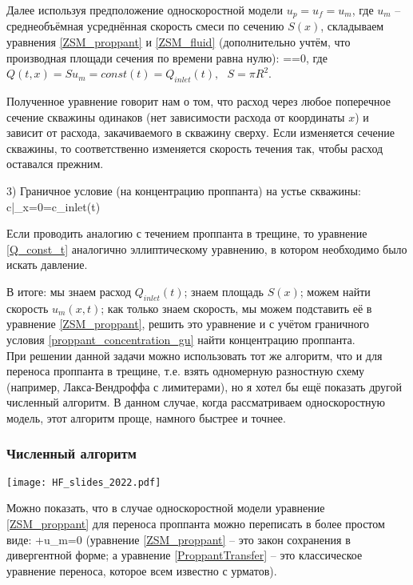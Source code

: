 \documentclass[main.tex]{subfiles}
\begin{document}
Далее используя предположение односкоростной модели $u_p=u_f=u_m$, где $u_m$ -- среднеобъёмная усреднённая скорость смеси по сечению $S(x)$, складываем уравнения \eqref{ZSM_proppant} и \eqref{ZSM_fluid} (дополнительно учтём, что производная площади сечения по времени равна нулю):
\beq\label{Q_const_t}
==0,
\eeq
где $Q(t,x)=Su_m=const(t)=Q_{inlet}(t),\,\,\,\,S=\pi R^2$.

Полученное уравнение говорит нам о том, что расход через любое поперечное сечение скважины одинаков (нет зависимости расхода от координаты $x$) и зависит от расхода, закачиваемого в скважину сверху.
Если изменяется сечение скважины, то соответственно изменяется скорость течения так, чтобы расход оставался прежним.

3) Граничное условие (на концентрацию проппанта) на устье скважины:
\beq\label{proppant_concentration_gu}
c|_{x=0}=c_{inlet}(t)
\eeq

Если проводить аналогию с течением проппанта в трещине, то уравнение \eqref{Q_const_t} аналогично эллиптическому уравнению, в котором необходимо было искать давление.

В итоге: мы знаем расход $Q_{inlet}(t)$; знаем площадь $S(x)$; можем найти скорость $u_m(x,t)$; как только знаем скорость, мы можем подставить её в уравнение \eqref{ZSM_proppant}, решить это уравнение и с учётом граничного условия \eqref{proppant_concentration_gu} найти концентрацию проппанта.
\\

При решении данной задачи можно использовать тот же алгоритм, что и для переноса проппанта в трещине, т.е. взять одномерную разностную схему (например, Лакса-Вендроффа с лимитерами), но я хотел бы ещё показать другой численный алгоритм.
В данном случае, когда рассматриваем односкоростную модель, этот алгоритм проще, намного быстрее и точнее.
\\

\subsubsection{Численный алгоритм}

\texttt{[image: HF\_slides\_2022.pdf]}

Можно показать, что в случае односкоростной модели уравнение \eqref{ZSM_proppant} для переноса проппанта можно переписать в более простом виде:
\beq\label{ProppantTransfer}
+u_m=0
\eeq
(уравнение \eqref{ZSM_proppant} -- это закон сохранения в дивергентной форме; а уравнение \eqref{ProppantTransfer} -- это классическое уравнение переноса, которое всем известно с урматов).
\end{document}
